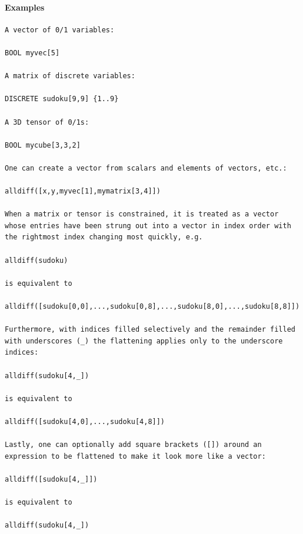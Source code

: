 \documentclass[oneside]{book}
\begin{document}
\paragraph{Examples}
{\footnotesize
\begin{verbatim}
A vector of 0/1 variables:

BOOL myvec[5]

A matrix of discrete variables:

DISCRETE sudoku[9,9] {1..9}

A 3D tensor of 0/1s:

BOOL mycube[3,3,2]

One can create a vector from scalars and elements of vectors, etc.:

alldiff([x,y,myvec[1],mymatrix[3,4]])

When a matrix or tensor is constrained, it is treated as a vector
whose entries have been strung out into a vector in index order with
the rightmost index changing most quickly, e.g.

alldiff(sudoku)

is equivalent to

alldiff([sudoku[0,0],...,sudoku[0,8],...,sudoku[8,0],...,sudoku[8,8]])

Furthermore, with indices filled selectively and the remainder filled
with underscores (_) the flattening applies only to the underscore
indices:

alldiff(sudoku[4,_])

is equivalent to

alldiff([sudoku[4,0],...,sudoku[4,8]])

Lastly, one can optionally add square brackets ([]) around an
expression to be flattened to make it look more like a vector:

alldiff([sudoku[4,_]])

is equivalent to

alldiff(sudoku[4,_])
\end{verbatim}
}






\end{document}
